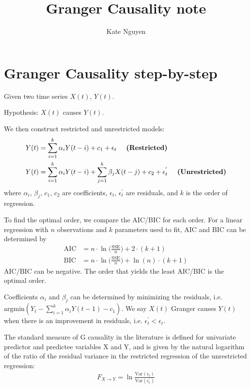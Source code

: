 \documentclass[]{article}
\title{Granger Causality note}
\author{Kate Nguyen}
\begin{document}
\maketitle

 \section{Granger Causality step-by-step}

Given two time series $X(t)$, $Y(t)$.

Hypothesis: $X(t)$ causes $Y(t)$.

We then construct restricted and unrestricted models:
\begin{align*}
	Y(t) &= \sum_{i = 1}^{k} \alpha_i Y(t-i)  + c_1 + \epsilon_t \hspace{5mm} \textbf{(Restricted)}\\
	Y(t) &= \sum_{i = 1}^{k} \alpha_i Y(t-i)  + \sum_{j = 1}^{k} \beta_j X(t-j) + c_2 + \epsilon_t^{'}  \hspace{5mm} \textbf{(Unrestricted)}
\end{align*}
where $\alpha_i$, $\beta_j$, $c_1$, $c_2$ are coefficients, $\epsilon_t$, $\epsilon_t^{'}$ are residuals, and $k$ is the order of regression. 

To find the optimal order, we compare the AIC/BIC for each order. For a linear regression with $n$ observations and $k$ parameters used to fit, AIC and BIC can be determined by
\begin{align}
	\text{AIC} &= n \cdot \ln \Bigg( \frac{\text{SSE}}{n} \Bigg) + 2 \cdot (k + 1) \\
	\text{BIC} &= n \cdot \ln \Bigg( \frac{\text{SSE}}{n} \Bigg) + \ln (n) \cdot (k + 1)
\end{align}
AIC/BIC can be negative. The order that yields the least AIC/BIC is the optimal order.

Coefficients $\alpha_i$ and $\beta_j$ can be determined by minimizing the residuals, i.e. $\text{argmin} (Y_t - \sum_{i = 1}^{k} \alpha_i Y(t-1)  - c_1)$. We say $X(t)$ Granger causes $Y(t)$ when there is an improvement in residuals, i.e. $\epsilon_t^{'} <  \epsilon_t$.

The standard measure of G causality in the literature is defined for univariate predictor and predictee variables X and Y, and is given by the natural logarithm of the ratio of the residual variance in the restricted regression of the unrestricted regression:
\begin{align}
	F_{X \rightarrow Y} = \ln \frac{\text{Var}(\epsilon_t)}{\text{Var}(\epsilon_t^{'})}
\end{align}
\end{document}
